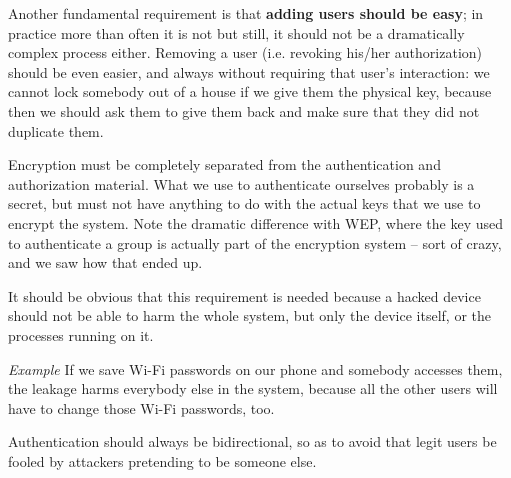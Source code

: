 \vspace{0.5em}

Another fundamental requirement is that \textbf{adding users should be easy}; in practice more than often it is not but still, it should not be a dramatically complex process either. Removing a user (i.e. revoking his/her authorization) should be even easier, and always without requiring that user’s interaction: we cannot lock somebody out of a house if we give them the physical key, because then we should ask them to give them back and make sure that they did not duplicate them.
 
Encryption must be completely separated from the authentication and authorization material. What we use to authenticate ourselves probably is a secret, but must not have anything to do with the actual keys that we use to encrypt the system. Note the dramatic difference with WEP, where the key used to authenticate a group is actually part of the encryption system – sort of crazy, and we saw how that ended up.
 
It should be obvious that this requirement is needed because a hacked device should not be able to harm the whole system, but only the device itself, or the processes running on it.

\vspace{0.5em}

\emph{Example} If we save Wi-Fi passwords on our phone and somebody accesses them, the leakage harms everybody else in the system, because all the other users will have to change those Wi-Fi passwords, too.

\vspace{0.5em}

Authentication should always be bidirectional, so as to avoid that legit users be fooled by attackers pretending to be someone else. 
 

